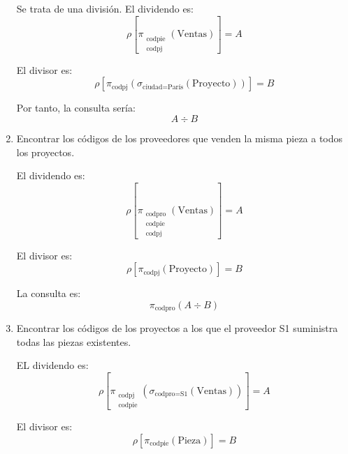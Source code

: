 \begin{ejercicio}
\begin{enumerate}
        Se trata de una división. El dividendo es:
        \begin{equation*}
            \rho\left[\pi_{\substack{\text{codpie}\\\text{codpj}}}\left(\text{Ventas}\right)\right]=A
        \end{equation*}

        El divisor es:
        \begin{equation*}
            \rho\left[\pi_{\text{codpj}}\left(\sigma_{\text{ciudad}=\text{París}}(\text{Proyecto})\right)\right]=B
        \end{equation*}

        Por tanto, la consulta sería:
        \begin{equation*}
            A \div B
        \end{equation*}

        \item Encontrar los códigos de los proveedores que venden la misma pieza a todos los proyectos.
        
        El dividendo es:
        \begin{equation*}
            \rho\left[\pi_{\substack{\text{codpro}\\\text{codpie}\\\text{codpj}}}(\text{Ventas})\right]=A
        \end{equation*}

        El divisor es:
        \begin{equation*}
            \rho\left[\pi_{\text{codpj}}(\text{Proyecto})\right]=B
        \end{equation*}

        La consulta es:
        \begin{equation*}
            \pi_{\text{codpro}}(A\div B)
        \end{equation*}
        \item Encontrar los códigos de los proyectos a los que el proveedor S1 suministra todas las piezas existentes.
        
        EL dividendo es:
        \begin{equation*}
            \rho\left[\pi_{\substack{\text{codpj}\\\text{codpie}}}\left(\sigma_{\text{codpro}=\text{S1}}(\text{Ventas})\right)\right]=A
        \end{equation*}

        El divisor es:
        \begin{equation*}
            \rho\left[\pi_{\text{codpie}}(\text{Pieza})\right]=B
        \end{equation*}


\end{enumerate}
\end{ejercicio}
